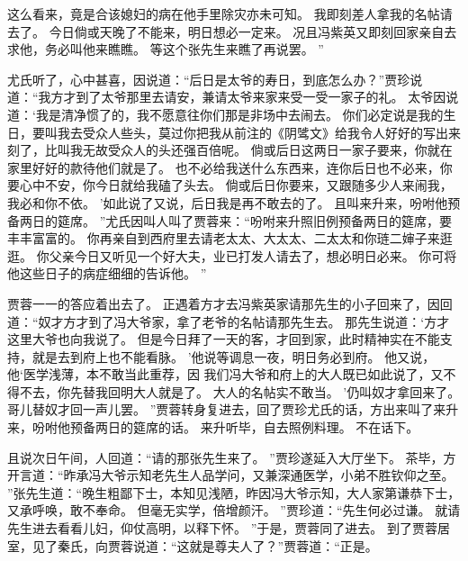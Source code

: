 这么看来，竟是合该媳妇的病在他手里除灾亦未可知。
我即刻差人拿我的名帖请去了。
今日倘或天晚了不能来，明日想必一定来。
况且冯紫英又即刻回家亲自去求他，务必叫他来瞧瞧。
等这个张先生来瞧了再说罢。
”\par
尤氏听了，心中甚喜，因说道：“后日是太爷的寿日，到底怎么办？”贾珍说道：“我方才到了太爷那里去请安，兼请太爷来家来受一受一家子的礼。
太爷因说道：‘我是清净惯了的，我不愿意往你们那是非场中去闹去。
你们必定说是我的生日，要叫我去受众人些头，莫过你把我从前注的《阴骘文》给我令人好好的写出来刻了，比叫我无故受众人的头还强百倍呢。
倘或后日这两日一家子要来，你就在家里好好的款待他们就是了。
也不必给我送什么东西来，连你后日也不必来，你要心中不安，你今日就给我磕了头去。
倘或后日你要来，又跟随多少人来闹我，我必和你不依。
’如此说了又说，后日我是再不敢去的了。
且叫来升来，吩咐他预备两日的筵席。
”尤氏因叫人叫了贾蓉来：“吩咐来升照旧例预备两日的筵席，要丰丰富富的。
你再亲自到西府里去请老太太、大太太、二太太和你琏二婶子来逛逛。
你父亲今日又听见一个好大夫，业已打发人请去了，想必明日必来。
你可将他这些日子的病症细细的告诉他。
”\par
贾蓉一一的答应着出去了。
正遇着方才去冯紫英家请那先生的小子回来了，因回道：“奴才方才到了冯大爷家，拿了老爷的名帖请那先生去。
那先生说道：‘方才这里大爷也向我说了。
但是今日拜了一天的客，才回到家，此时精神实在不能支持，就是去到府上也不能看脉。
’他说等调息一夜，明日务必到府。
他又说，他‘医学浅薄，本不敢当此重荐，因	我们冯大爷和府上的大人既已如此说了，又不得不去，你先替我回明大人就是了。
大人的名帖实不敢当。
’仍叫奴才拿回来了。
哥儿替奴才回一声儿罢。
”贾蓉转身复进去，回了贾珍尤氏的话，方出来叫了来升来，吩咐他预备两日的筵席的话。
来升听毕，自去照例料理。
不在话下。
\par
且说次日午间，人回道：“请的那张先生来了。
”贾珍遂延入大厅坐下。
茶毕，方开言道：“昨承冯大爷示知老先生人品学问，又兼深通医学，小弟不胜钦仰之至。
”张先生道：“晚生粗鄙下士，本知见浅陋，昨因冯大爷示知，大人家第谦恭下士，又承呼唤，敢不奉命。
但毫无实学，倍增颜汗。
”贾珍道：“先生何必过谦。
就请先生进去看看儿妇，仰仗高明，以释下怀。
”于是，贾蓉同了进去。
到了贾蓉居室，见了秦氏，向贾蓉说道：“这就是尊夫人了？”贾蓉道：“正是。
